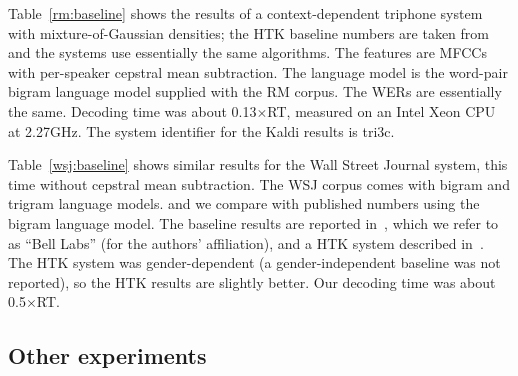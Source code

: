 \documentclass[10pt,conference,letterpaper]{IEEEtran}
\begin{document}
Table~\ref{rm:baseline} shows the results of a context-dependent triphone system
with mixture-of-Gaussian densities; the HTK baseline numbers are taken 
from~\cite{Povey:ICASSP99} and the systems use essentially the same algorithms.
The features are MFCCs with per-speaker cepstral mean subtraction.  The language
model is the word-pair bigram language model supplied with the RM corpus.
The WERs are essentially the same.  Decoding time was about 0.13$\times$RT, measured
on an Intel Xeon CPU at 2.27GHz.  The system identifier for the Kaldi results is
tri3c.

Table~\ref{wsj:baseline} shows similar results for the Wall Street Journal 
system, this time without cepstral mean subtraction.  The WSJ corpus comes with
bigram and trigram language models.
and we compare with published numbers using the bigram language model. The 
baseline results are reported in~\cite{Reichl:ITSAP00}, which we refer to as 
``Bell Labs'' (for the authors' affiliation), and a HTK system described 
in~\cite{Woodland:ICASSP94}.  The HTK system was gender-dependent (a gender-independent
baseline was not reported), so the HTK results are slightly better.  Our decoding
time was about 0.5$\times$RT.

\begin{table}
\end{table}


\subsection{Other experiments}
\end{document}
